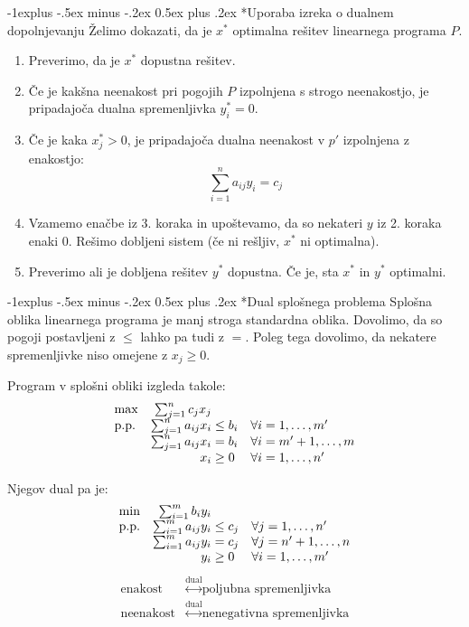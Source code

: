 \documentclass[a4paper,8pt]{extarticle}
\makeatletter
\renewcommand{\subsection}{\@startsection{subsection}{2}{0mm}%
                                {-1explus -.5ex minus -.2ex}%
                                {0.5ex plus .2ex}%
                                {\normalfont\normalsize\bfseries}}
\makeatother
\begin{document}
\begin{multicols}{4}
\subsection*{Uporaba izreka o dualnem dopolnjevanju}
Želimo dokazati, da je $x^*$ optimalna rešitev linearnega programa $P$.

\begin{enumerate}
	\item Preverimo, da je $x^*$ dopustna rešitev.
	\item Če je kakšna neenakost pri pogojih $P$ izpolnjena s strogo neenakostjo, je pripadajoča dualna spremenljivka $y^*_i = 0$.
	\item Če je kaka $x^*_j > 0$, je pripadajoča dualna neenakost v $p'$ izpolnjena z enakostjo: \[\sum_{i=1}^n a_{ij} y_i = c_j \]
	\item Vzamemo enačbe iz 3. koraka in upoštevamo, da so nekateri $y$ iz 2. koraka enaki 0. Rešimo dobljeni sistem (če ni rešljiv, $x^*$ ni optimalna).
	\item Preverimo ali je dobljena rešitev $y^*$ dopustna. Če je, sta $x^*$ in $y^*$ optimalni.
\end{enumerate}

\subsection*{Dual splošnega problema}
Splošna oblika linearnega programa je manj stroga standardna oblika.
Dovolimo, da so pogoji postavljeni z $\leq$ lahko pa tudi z $=$. Poleg tega dovolimo, da nekatere spremenljivke niso omejene z $x_j \geq 0$.

Program v splošni obliki izgleda takole:
\begin{align*}
	\begin{array}{l r@{\;} l >{\scriptsize}l}
		\max 		& \sum_{j=1}^n c_j x_j	\\		
		\text{p.p.} & \sum_{j=1}^n a_{ij} x_i 	&\leq b_i	& \forall i=1,\dots , m'\\
					& \sum_{j=1}^n a_{ij} x_i 	&= b_i	& \forall i=m'+1,\dots , m\\
					& x_i 	 					&\geq 0	&\forall i=1,\dots , n'
	\end{array}
\end{align*}

Njegov dual pa je:
\begin{align*}
	\begin{array}{l r@{\;} l >{\scriptsize}l}
		\min 		& \sum_{i=1}^m b_i y_i	\\		
		\text{p.p.} & \sum_{i=1}^m a_{ij} y_i 	&\leq c_j	& \forall j=1,\dots , n'\\
					& \sum_{i=1}^m a_{ij} y_i 	&= c_j	& \forall j=n'+1,\dots , n\\
					& y_i 	 					&\geq 0	&\forall i=1,\dots , m'
	\end{array}
\end{align*}
\begin{align*}
	\text{enakost} &\overset{\text{dual}}{\longleftrightarrow} \text{poljubna spremenljivka} \\
	\text{neenakost} &\overset{\text{dual}}{\longleftrightarrow} \text{nenegativna spremenljivka} 	
\end{align*}


\end{multicols}
\end{document}

